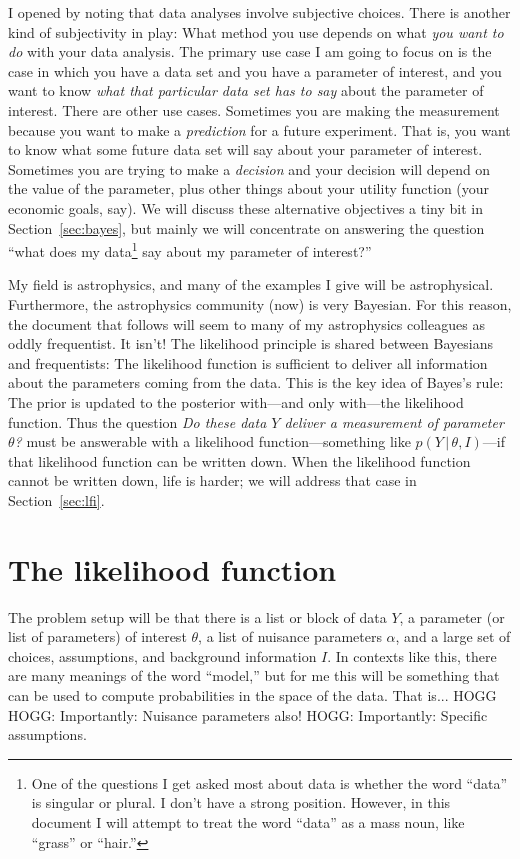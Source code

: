 \documentclass{article}
\newcommand{\sectionname}{Section}
\newcommand{\secref}[1]{\sectionname~\ref{#1}}
\newcommand{\given}{\,|\,}
\begin{document}
I opened by noting that data analyses involve subjective choices.
There is another kind of subjectivity in play:
What method you use depends on what \emph{you want to do} with your data analysis.
The primary use case I am going to focus on is the case in which you have a data set and you have a parameter of interest, and you want to know \emph{what that particular data set has to say} about the parameter of interest.
There are other use cases.
Sometimes you are making the measurement because you want to make a \emph{prediction} for a future experiment.
That is, you want to know what some future data set will say about your parameter of interest.
Sometimes you are trying to make a \emph{decision} and your decision will depend on the value of the parameter, plus other things about your utility function (your economic goals, say).
We will discuss these alternative objectives a tiny bit in \secref{sec:bayes}, but mainly we will concentrate on answering the question ``what does my data\footnote{%
One of the questions I get asked most about data is whether the word ``data'' is singular or plural. I don't have a strong position. However, in this document I will attempt to treat the word ``data'' as a mass noun, like ``grass'' or ``hair.''}
say about my parameter of interest?''

My field is astrophysics, and many of the examples I give will be astrophysical.
Furthermore, the astrophysics community (now) is very Bayesian.
For this reason, the document that follows will seem to many of my astrophysics colleagues as oddly frequentist.
It isn't!
The likelihood principle is shared between Bayesians and frequentists:
The likelihood function is sufficient to deliver all information about the parameters coming from the data.
This is the key idea of Bayes's rule:
The prior is updated to the posterior with---and only with---the likelihood function.
Thus the question \emph{Do these data $Y$ deliver a measurement of parameter $\theta$?} must be answerable with a likelihood function---something like $p(Y\given\theta,I)$---if that likelihood function can be written down.
When the likelihood function cannot be written down, life is harder; we will address that case in \secref{sec:lfi}.

\section{The likelihood function}\label{sec:lf}
The problem setup will be that there is a list or block of data $Y$, a parameter (or list of parameters) of interest $\theta$, a list of nuisance parameters $\alpha$, and a large set of choices, assumptions, and background information $I$.
In contexts like this, there are many meanings of the word ``model,'' but for me this will be something that can be used to compute probabilities in the space of the data.
That is... HOGG
HOGG: Importantly: Nuisance parameters also!
HOGG: Importantly: Specific assumptions.
\end{document}
